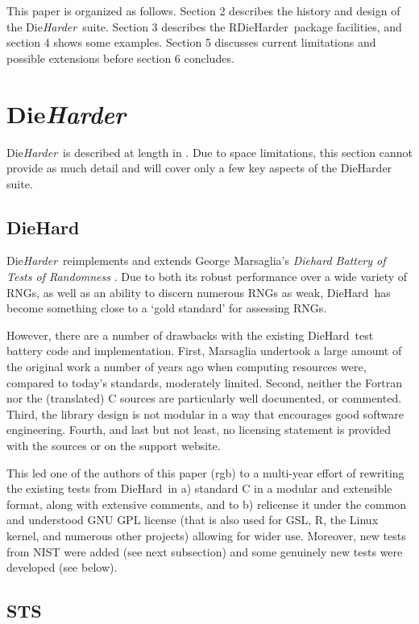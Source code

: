\documentclass[12pt]{article}
\newcommand{\pkg}[1]{{\normalfont\fontseries{b}\selectfont #1}}
\newcommand{\diehard}{\textrm{DieHard}}
\newcommand{\dieharder}{\textrm{Die}\textsl{Harder}}
\newcommand{\rdieharder}{\pkg{RDieHarder}}
\begin{document}
This paper is organized as follows. Section 2 describes the history and
design of the \dieharder\ suite.  Section 3 describes the \rdieharder\
package facilities, and section 4 shows some examples.  Section 5 discusses
current limitations and possible extensions before section 6 concludes.


\section{\dieharder}

\dieharder\ is described at length in \cite{Brown:dieharderpaper:2006}.  Due
to space limitations, this section cannot provide as much detail and will
cover only a few key aspects of the DieHarder suite.

\subsection{\diehard}
\dieharder\ reimplements and extends George Marsaglia's \textsl{Diehard Battery
  of Tests of Randomness} \citep{Marsaglia:1996}. Due to both its robust
performance over a wide variety of RNGs, as well as an ability to discern
numerous RNGs as weak, \diehard\ has become something close to a `gold standard'
for assessing RNGs.

However, there are a number of drawbacks with the existing \diehard\ test
battery code and implementation.  First, Marsaglia undertook a large
amount of the original work a number of years ago when computing resources
were, compared to today's standards, moderately limited. Second, neither the
Fortran nor the (translated) C sources are particularly well documented, or
commented. Third, the library design is not modular in a way that
encourages good software engineering. Fourth, and last but not least, no
licensing statement is provided with the sources or on the support website.

This led one of the authors of this paper (rgb) to a multi-year effort of
rewriting the existing tests from \diehard\ in a) standard C in a modular and
extensible format, along with extensive comments, and to b) relicense it
under the common and understood GNU GPL license (that is also used for GSL,
R, the Linux kernel, and numerous other projects) allowing for wider use.
Moreover, new tests from NIST were added (see next subsection) and some
genuinely new tests were developed (see below).


\subsection{STS}
\end{document}
